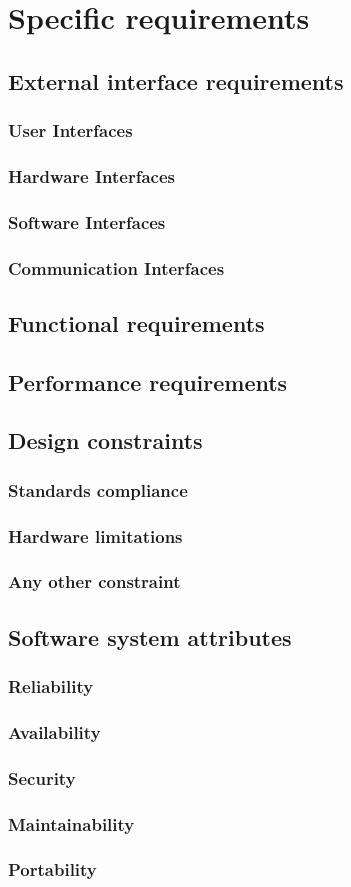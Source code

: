 \chapter{Specific requirements}

\section{External interface requirements}
\subsection{User Interfaces}
\subsection{Hardware Interfaces}
\subsection{Software Interfaces}
\subsection{Communication Interfaces}

\section{Functional requirements}

\section{Performance requirements}

\section{Design constraints}
\subsection{Standards compliance}
\subsection{Hardware limitations}
\subsection{Any other constraint}

\section{Software system attributes}
\subsection{Reliability}
\subsection{Availability}
\subsection{Security}
\subsection{Maintainability}
\subsection{Portability}
